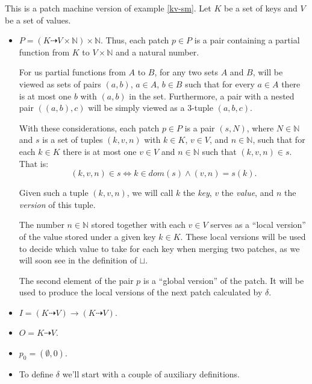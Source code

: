 \documentclass[12pt,a4paper,en]{pracamgr}
\newcommand{\ti}[1]{\textit{#1}}
\newcommand{\mbb}[1]{\mathbb{#1}}
\begin{document}
\begin{ex}\label{kv-pm}
    This is a patch machine version of example \ref{kv-sm}. Let $K$ be a set of keys and $V$ be a set of values.
	\begin{itemize}
        \item $P = (K \dashrightarrow V \times \mbb N) \times \mbb N$. Thus, each patch $p \in P$ is a pair containing a partial function from $K$ to $V \times \mbb N$ and a natural number.

            For us partial functions from $A$ to $B$, for any two sets $A$ and $B$, will be viewed as sets of pairs $(a, b)$, $a \in A$, $b \in B$ such that for every $a \in A$ there is at most one $b$ with $(a, b)$ in the set. Furthermore, a pair with a nested pair $((a, b), c)$ will be simply viewed as a 3-tuple $(a, b, c)$.

            With these considerations, each patch $p \in P$ is a pair $(s, N)$, where $N \in \mbb N$ and $s$ is a set of tuples $(k, v, n)$ with $k \in K$, $v \in V$, and $n \in \mbb N$, such that for each $k \in K$ there is at most one $v \in V$ and $n \in \mbb N$ such that $(k, v, n) \in s$. That is:
            $$ (k, v, n) \in s \Leftrightarrow k \in dom(s) \land (v, n) = s(k). $$

            Given such a tuple $(k, v, n)$, we will call $k$ the \ti{key}, $v$ the \ti{value}, and $n$ the \ti{version} of this tuple.

            The number $n \in \mbb N$ stored together with each $v \in V$ serves as a ``local version'' of the value stored under a given key $k \in K$. These local versions will be used to decide which value to take for each key when merging two patches, as we will soon see in the definition of $\sqcup$.

            The second element of the pair $p$ is a ``global version'' of the patch. It will be used to produce the local versions of the next patch calculated by $\delta$.

		\item $I = (K \dashrightarrow V) \rightarrow (K \dashrightarrow V)$.

		\item $O = K \dashrightarrow V$.

        \item $p_0 = (\emptyset, 0)$.

		\item To define $\delta$ we'll start with a couple of auxiliary definitions.


\end{itemize}
\end{ex}
\end{document}
